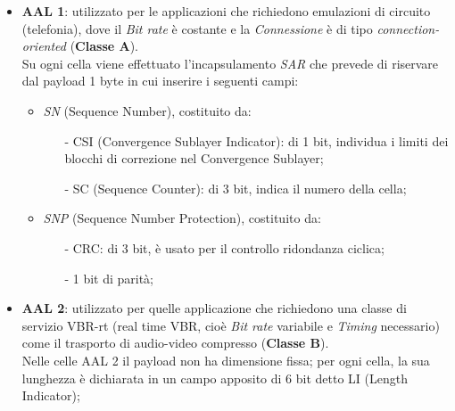 \documentclass[a4paper,11pt]{article}
\begin{document}
\begin{itemize}
	\item \textbf{AAL 1}: utilizzato per le applicazioni che richiedono emulazioni di circuito (telefonia), dove il \textit{Bit rate} è costante e la \textit{Connessione} è di tipo \textit{connection-oriented} (\textbf{Classe A}).
	\\Su ogni cella viene effettuato l'incapsulamento \textit{SAR} che prevede di riservare dal payload 1 byte in cui inserire i seguenti campi:
	\begin{itemize}
		\item \textit{SN} (Sequence Number), costituito da:
		\begin{itemize}
			\item[-] CSI (Convergence Sublayer Indicator): di 1 bit, individua i limiti dei blocchi di correzione nel Convergence Sublayer;
			\item[-] SC (Sequence Counter): di 3 bit, indica il numero della 	cella;
		\end{itemize}
		\item \textit{SNP} (Sequence Number Protection), costituito da:
		\begin{itemize}
			\item[-] CRC: di 3 bit, è usato per il controllo ridondanza ciclica;
			\item[-] 1 bit di parità;
		\end{itemize}
		
	\end{itemize}
	
	\item \textbf{AAL 2}: utilizzato per quelle applicazione che richiedono una classe di servizio VBR-rt (real time VBR, cioè \textit{Bit rate} variabile e \textit{Timing} necessario) come il trasporto di audio-video compresso (\textbf{Classe B}).
	\\Nelle celle AAL 2 il payload non ha dimensione fissa; per ogni cella, la sua lunghezza è dichiarata in un campo apposito di 6 bit detto LI (Length Indicator);
	

\end{itemize}
\end{document}
